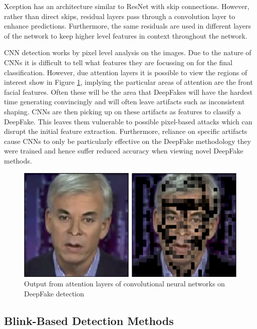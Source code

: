 Xception has an architecture similar to ResNet with skip connections. However, rather than direct skips, residual layers pass through a convolution layer to enhance predictions. Furthermore, the same residuals are used in different layers of the network to keep higher level features in context throughout the network.

CNN detection works by pixel level analysis on the images. Due to the nature of CNNs it is difficult to tell what features they are focussing on for the final classification. However, due attention layers it is possible to view the regions of interest show in Figure \ref{fig:attention}, implying the particular areas of attention are the front facial features. Often these will be the area that DeepFakes will have the hardest time generating convincingly and will often leave artifacts such as inconsistent shaping\cite{verdoliva2020media}. CNNs are then picking up on these artifacts as features to classify a DeepFake. This leaves them vulnerable to possible pixel-based attacks which can disrupt the initial feature extraction\cite{gandhi2020adversarial}. Furthermore, reliance on specific artifacts cause CNNs to only be particularly effective on the DeepFake methodology they were trained and hence suffer reduced accuracy when viewing novel DeepFake methods\cite{thing2023deepfake}.

\begin{figure}[h]
    \centering
    \includegraphics[width=0.5\linewidth]{dissertation//figures/attention-cnns.png}
    \caption{Output from attention layers of convolutional neural networks on DeepFake detection\cite{bonettini2021video}}
    \label{fig:attention}
\end{figure}

\subsection{Blink-Based Detection Methods}


